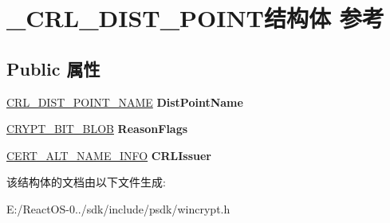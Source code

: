 \hypertarget{struct___c_r_l___d_i_s_t___p_o_i_n_t}{}\section{\+\_\+\+C\+R\+L\+\_\+\+D\+I\+S\+T\+\_\+\+P\+O\+I\+N\+T结构体 参考}
\label{struct___c_r_l___d_i_s_t___p_o_i_n_t}
\subsection*{Public 属性}
\begin{DoxyCompactItemize}
\item 
\mbox{\label{struct___c_r_l___d_i_s_t___p_o_i_n_t_ad78d9963b3500d7faaf320e5ee426244}} 
\hyperlink{struct___c_r_l___d_i_s_t___p_o_i_n_t___n_a_m_e}{C\+R\+L\+\_\+\+D\+I\+S\+T\+\_\+\+P\+O\+I\+N\+T\+\_\+\+N\+A\+ME} {\bfseries Dist\+Point\+Name}
\item 
\mbox{\label{struct___c_r_l___d_i_s_t___p_o_i_n_t_a5d5e84b805b74d85e15e3f9a5497214b}} 
\hyperlink{struct___c_r_y_p_t___b_i_t___b_l_o_b}{C\+R\+Y\+P\+T\+\_\+\+B\+I\+T\+\_\+\+B\+L\+OB} {\bfseries Reason\+Flags}
\item 
\mbox{\label{struct___c_r_l___d_i_s_t___p_o_i_n_t_a6f6f92a5e52c044a0b9a01772e0f5c8a}} 
\hyperlink{struct___c_e_r_t___a_l_t___n_a_m_e___i_n_f_o}{C\+E\+R\+T\+\_\+\+A\+L\+T\+\_\+\+N\+A\+M\+E\+\_\+\+I\+N\+FO} {\bfseries C\+R\+L\+Issuer}
\end{DoxyCompactItemize}


该结构体的文档由以下文件生成\+:\begin{DoxyCompactItemize}
\item 
E\+:/\+React\+O\+S-\/0../sdk/include/psdk/wincrypt.\+h\end{DoxyCompactItemize}
